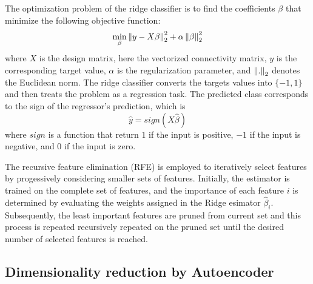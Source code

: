 The optimization problem of the ridge classifier is to find the coefficients $\beta$ that minimize the following objective function:
$$
\min_{\beta} \left\lVert y - X\beta\right\rVert_2^2 + \alpha \left\lVert\beta\right\rVert_2^2
$$
where $X$ is the design matrix, here the vectorized connectivity matrix, $y$ is the corresponding target value, $\alpha$ is the regularization parameter, and $\left\lVert.\right\rVert_2$ denotes the Euclidean norm. The ridge classifier converts the targets values into $\{-1, 1\}$ and then treats the problem as a regression task. The predicted class corresponds to the sign of the regressor's prediction, which is
$$
\hat{y} = sign(X\hat{\beta})
$$
where $sign$ is a function that return $1$ if the input is positive, $-1$ if the input is negative, and $0$ if the input is zero.

The recursive feature elimination (RFE) is employed to iteratively select features by progessively considering smaller sets of features. Initially, the estimator is trained on the complete set of features, and the importance of each feature $i$ is determined by evaluating the weights assigned in the Ridge esimator $\hat{\beta}_i$. Subsequently, the least important features are pruned from current set and this process is repeated recursively repeated on the pruned set until the desired number of selected features is reached.

\subsection{Dimensionality reduction by Autoencoder}


